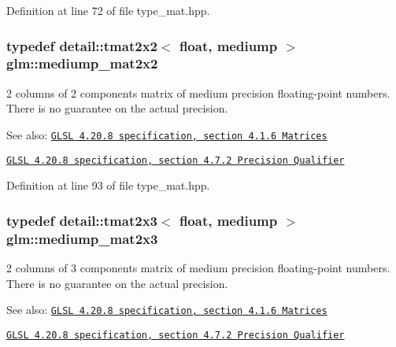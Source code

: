 Definition at line 72 of file type\_\-mat.hpp.\hypertarget{group__core__precision_g867b486aea2d228a1e1a134af73b2c4b}{
\subsubsection[mediump\_\-mat2x2]{\setlength{\rightskip}{0pt plus 5cm}typedef detail::tmat2x2$<$ float, mediump $>$ {\bf glm::mediump\_\-mat2x2}}}
\label{group__core__precision_g867b486aea2d228a1e1a134af73b2c4b}


2 columns of 2 components matrix of medium precision floating-point numbers. There is no guarantee on the actual precision.

\begin{Desc}
\item[See also:]\href{http://www.opengl.org/registry/doc/GLSLangSpec.4.20.8.pdf}{\tt GLSL 4.20.8 specification, section 4.1.6 Matrices} 

\href{http://www.opengl.org/registry/doc/GLSLangSpec.4.20.8.pdf}{\tt GLSL 4.20.8 specification, section 4.7.2 Precision Qualifier} \end{Desc}


Definition at line 93 of file type\_\-mat.hpp.\hypertarget{group__core__precision_gd4e099c0dfa8f35ce9c0ddc8605428cf}{
\subsubsection[mediump\_\-mat2x3]{\setlength{\rightskip}{0pt plus 5cm}typedef detail::tmat2x3$<$ float, mediump $>$ {\bf glm::mediump\_\-mat2x3}}}
\label{group__core__precision_gd4e099c0dfa8f35ce9c0ddc8605428cf}


2 columns of 3 components matrix of medium precision floating-point numbers. There is no guarantee on the actual precision.

\begin{Desc}
\item[See also:]\href{http://www.opengl.org/registry/doc/GLSLangSpec.4.20.8.pdf}{\tt GLSL 4.20.8 specification, section 4.1.6 Matrices} 

\href{http://www.opengl.org/registry/doc/GLSLangSpec.4.20.8.pdf}{\tt GLSL 4.20.8 specification, section 4.7.2 Precision Qualifier} \end{Desc}


